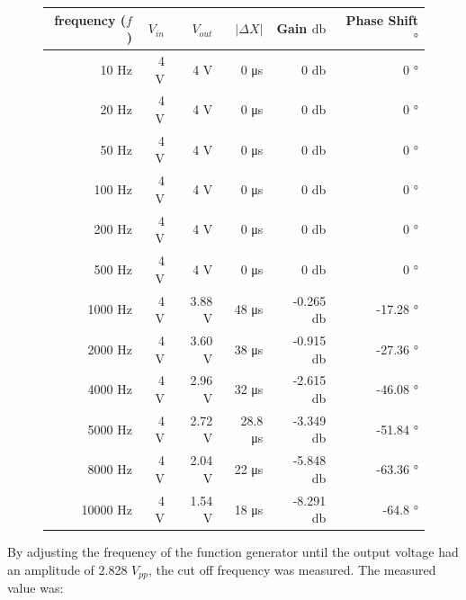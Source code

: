 \documentclass{article}
\begin{document}
\begin{figure}[H]
	\centering
	\begin{tabular}{ | r | r | r | r | r | r | }
		\hline
		frequency ($f$) & $V_{in}$ & $V_{out}$ & $|\Delta X|$ & Gain $\si{\decibel}$ & Phase Shift $\si{\degree}$ \\ \hline
		10 \si{\hertz} & 4 \si{\volt} & 4 \si{\volt} & 0 \si{\micro\second} & 0 \si{\decibel} & 0 \si{\degree}\\ \hline
		20 \si{\hertz} & 4 \si{\volt} & 4 \si{\volt} & 0 \si{\micro\second} & 0 \si{\decibel} & 0 \si{\degree}\\ \hline
		50 \si{\hertz} & 4 \si{\volt} & 4 \si{\volt} & 0 \si{\micro\second} & 0 \si{\decibel} & 0 \si{\degree}\\ \hline
		100 \si{\hertz} & 4 \si{\volt} & 4 \si{\volt} & 0 \si{\micro\second} & 0 \si{\decibel} & 0 \si{\degree}\\ \hline
		200 \si{\hertz} & 4 \si{\volt} & 4 \si{\volt} & 0 \si{\micro\second} & 0 \si{\decibel} & 0 \si{\degree}\\ \hline
		500 \si{\hertz} & 4 \si{\volt} & 4 \si{\volt} & 0 \si{\micro\second} & 0 \si{\decibel} & 0 \si{\degree}\\ \hline
		1000 \si{\hertz} & 4 \si{\volt} & 3.88 \si{\volt} & 48 \si{\micro\second} & -0.265 \si{\decibel} & -17.28 \si{\degree}\\ \hline
		2000 \si{\hertz} & 4 \si{\volt} & 3.60 \si{\volt} & 38 \si{\micro\second} & -0.915 \si{\decibel} & -27.36 \si{\degree}\\ \hline
		4000 \si{\hertz} & 4 \si{\volt} & 2.96 \si{\volt} & 32 \si{\micro\second} & -2.615 \si{\decibel} & -46.08 \si{\degree}\\ \hline
		5000 \si{\hertz} & 4 \si{\volt} & 2.72 \si{\volt} & 28.8 \si{\micro\second} & -3.349 \si{\decibel} & -51.84 \si{\degree}\\ \hline
		8000 \si{\hertz} & 4 \si{\volt} & 2.04 \si{\volt} & 22 \si{\micro\second} & -5.848 \si{\decibel} & -63.36 \si{\degree}\\ \hline
		10000 \si{\hertz} & 4 \si{\volt} & 1.54 \si{\volt} & 18 \si{\micro\second} & -8.291 \si{\decibel} & -64.8 \si{\degree}\\ \hline
	\end{tabular}
\end{figure}

By adjusting the frequency of the function generator until the output voltage had an amplitude of 2.828 $\si{V_{pp}}$, the cut off frequency was measured. The measured value was:
\end{document}
